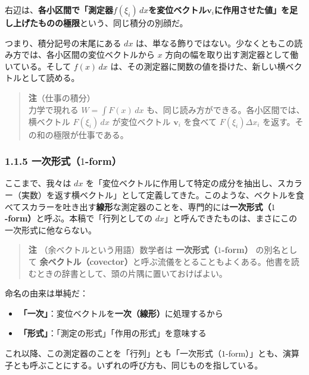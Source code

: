 \documentclass[a4paper,12pt,openany]{book}
\begin{document}
右辺は、\textbf{各小区間で「測定器}\(f(\xi_i)\,dx\)\textbf{を変位ベクトル}\(\mathbf{v}_i\)\textbf{に作用させた値」を足し上げたものの極限}という、同じ積分の別顔だ。

つまり、積分記号の末尾にある \(dx\)
は、単なる飾りではない。少なくともこの読み方では、各小区間の変位ベクトルから
\(x\) 方向の幅を取り出す測定器として働いている。そして \(f(x)\,dx\)
は、その測定器に関数の値を掛けた、新しい横ベクトルとして読める。

\begin{quote}
\textbf{注}（仕事の積分）\\
力学で現れる \(W=\int F(x)\,dx\)
も、同じ読み方ができる。各小区間では、横ベクトル \(F(\xi_i)\,dx\)
が変位ベクトル \(\mathbf v_i\) を食べて \(F(\xi_i)\Delta x_i\)
を返す。その和の極限が仕事である。
\end{quote}

\hypertarget{ux4e00ux6b21ux5f62ux5f0f1-form}{%
\subsubsection{\texorpdfstring{1.1.5
一次形式（\(1\)-form）}{1.1.5 一次形式（1-form）}}\label{ux4e00ux6b21ux5f62ux5f0f1-form}}

ここまで、我々は \(dx\)
を「変位ベクトルに作用して特定の成分を抽出し、スカラー（実数）を返す横ベクトル」として定義してきた。このような、ベクトルを食べてスカラーを吐き出す\textbf{線形}な測定器のことを、専門的には\textbf{一次形式（}\(1\)\textbf{-form）}と呼ぶ。本稿で「行列としての
\(dx\)」と呼んできたものは、まさにこの一次形式に他ならない。

\begin{quote}
\textbf{注} （余ベクトルという用語）数学者は
\textbf{一次形式（}\(1\)\textbf{-form）} の別名として
\textbf{余ベクトル（covector）}と呼ぶ流儀をとることもよくある。他書を読むときの辞書として、頭の片隅に置いておけばよい。
\end{quote}

命名の由来は単純だ：

\begin{itemize}
\item
  \textbf{「一次」}：変位ベクトルを\textbf{一次（線形）}に処理するから
\item
  \textbf{「形式」}：「測定の形式」「作用の形式」を意味する
\end{itemize}

これ以降、この測定器のことを「行列」とも「一次形式（\(1\)-form）」とも、演算子とも呼ぶことにする。いずれの呼び方も、同じものを指している。
\end{document}
